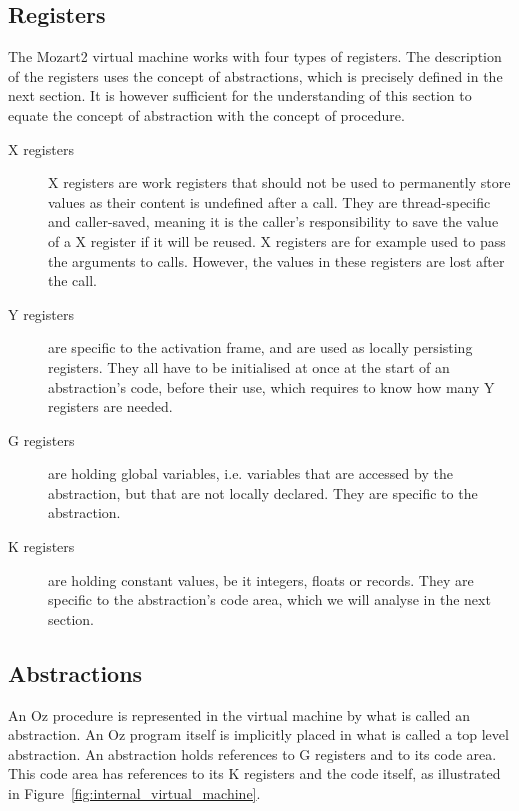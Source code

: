 \documentclass[a4paper]{memoir}
\begin{document}
\subsection{Registers}\label{sec:intro:registers}
The Mozart2 virtual machine works with four types of registers. The description of the registers uses the concept of abstractions, which is precisely defined in the next section. It is however sufficient for the understanding of this section to equate the concept of abstraction with the concept of procedure.
\begin{description}
  \item[X registers]X registers are work registers that should not be used to permanently
    store values as their content is undefined after a call. They are thread-specific and caller-saved, meaning it is the
    caller's responsibility to save the value of a X register if it will be
    reused.  X registers are for example used to pass the arguments to calls. However, the values in these registers are lost after the call.
  \item[Y registers]are specific to the activation frame, and are used as locally persisting registers. They all have to be initialised at once at the start of an abstraction's code, before their use, which requires to know how many Y registers are needed.
  \item[G registers] are holding global variables, i.e. variables that are
    accessed by the abstraction, but that are not locally declared. They are
    specific to the abstraction.
  \item[K registers] are holding constant values, be it integers, floats or
    records. They are specific to the abstraction's code area, which we will analyse in the
    next section.
\end{description}

\subsection{Abstractions}\label{sec:vm:abstractions}
An Oz procedure is represented in the virtual machine by what is called an abstraction. An Oz program itself is implicitly placed in what is called a top level abstraction.
An abstraction holds references to G registers and to its code area. This code
area has references to its K registers and the code itself, as illustrated in
Figure~\ref{fig:internal_virtual_machine}.
\end{document}
